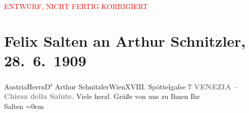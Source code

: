 
\begin{center}
            \textcolor{red}{ENTWURF, NICHT FERTIG KORRIGIERT}
                      \end{center}
            
         \renewcommand{\erwaehnteOrte}{Orte: Bahnhof, Edmund-Weiß-Gasse, Santa Maria della Salute, Venedig, Wien, Österreich}
         \renewcommand{\erwaehnteWerke}{}
               \section[Felix Salten an Arthur Schnitzler, 28. 6. 1909]{ Felix Salten an Arthur Schnitzler, 28. 6. 1909}\nopagebreak{}\rehead{ }\begin{ledgroupsized}[t]{13cm}\normalsize\beginnumbering \toendnotes[C]{\smallbreak\pagebreak[2]} 
\pstart{}{\pb}Austria\pend{}\pstart{}Herrn\pend{}\pstart{}D\textsuperscript{r} Arthur Schnitzler\pend{}\pstart{}Wien\pend{}\pstart{}XVIII. Spöttelgaſse 7\pend{}{\bigskip}\pstart
           \noindent{}\centering{}{\pb}\textcolor{gray}{\textbf{VENEZIA – Chiesa della Salute.}}\pend
           \pstart
           Viele herzl. Grüße von uns zu Ihnen\pend
           \pstart
           Ihr {\\[\baselineskip]}\spacefill\mbox{Salten}\pend
           \leftskip=0em{}
         
         \endnumbering{}\end{ledgroupsized}\begin{anhang}\end{anhang}\newcommand{\dateiname}{L03500}\newcommand{\titel}{Felix Salten an Arthur Schnitzler, 28. 6. 1909}\newcommand{\editorInnen}{Martin Anton Müller und Laura Untner}
      
